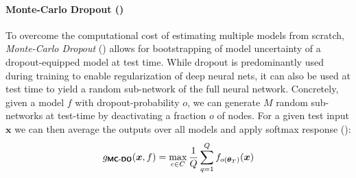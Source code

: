  \paragraph{Monte-Carlo Dropout (\mcdo)} 
  To overcome the computational cost of estimating multiple models from scratch, \emph{Monte-Carlo Dropout} (\mcdo) \citep{gal2016dropout} allows for bootstrapping of model uncertainty of a dropout-equipped model at test time. While dropout is predominantly used during training to enable regularization of deep neural nets, it can also be used at test time to yield a random sub-network of the full neural network. Concretely, given a model $f$ with dropout-probability $o$, we can generate $M$ random sub-networks at test-time by deactivating a fraction $o$ of nodes. For a given test input $\bm{x}$ we can then average the outputs over all models and apply softmax response (\sr):
 \begin{equation}
 	g_{\textbf{\sffamily MC-DO}}(\bm{x}, f) = \max_{c \in C} \frac{1}{Q} \sum_{q=1}^{Q} f_{o(\bm{\theta}_{T})}(\bm{x})
 \end{equation}








